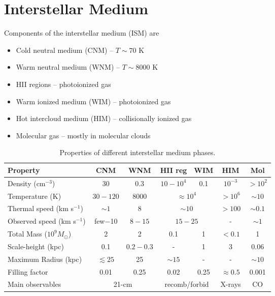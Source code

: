  \label{ch:Introduction}
\section*{Interstellar Medium}
Components of the interstellar medium (ISM) are 
\begin{itemize}
  \item \textsf{Cold neutral medium (CNM)} -- $T \sim 70$ K
  \item \textsf{Warm neutral medium (WNM)} -- $T \sim 8000$ K
  \item \textsf{HII regions} -- photoionized gas
  \item \textsf{Warm ionized medium (WIM)} -- photoionized gas
  \item \textsf{Hot intercloud medium (HIM)} -- collisionally ionized gas
  \item \textsf{Molecular gas} -- mostly in molecular clouds
\end{itemize} 

\begin{table}[h]
    \centering
    \begin{tabular}{lcccccc}
        \toprule
        Property & CNM & WNM & HII reg & WIM & HIM & Mol \\
        \midrule
        Density (cm$^{-3}$) & 30 & 0.3 & $10 - 10^4$ & 0.1 & $10^{-3}$ & $> 10^2$ \\
        Temperature (K) & $30 - 120$ & 8000 & \multicolumn{2}{c}{$\approx 10^4$} & $> 10^6$ & $\sim 10$ \\
          Thermal speed (km s$^{-1}$) & $\sim 1$ & 8 & \multicolumn{2}{c}{$\sim 10$} & $> 100$ & $\sim 0.1$ \\
          Observed speed (km s$^{-1}$) & few$-$10 & $8 - 15$ & \multicolumn{2}{c}{$15 - 25$} & - & $\sim 1$ \\
        Total Mass ($10^9 M_\odot$) & 2 & 2 & 0.1 & 1 & $< 0.1$ & 1 \\
        Scale-height (kpc) & 0.1 & $0.2 - 0.3$ & - & 1 & 3 & 0.06 \\
        Maximum Radius (kpc) & $\lesssim 25$ & 25 & $\sim 15$ & - & - & $\sim 10$ \\
        Filling factor & 0.01 & 0.25 & 0.02 & 0.25 & $\approx 0.5$ & 0.001 \\
        Main observables & \multicolumn{2}{c}{21-cm} & \multicolumn{2}{c}{recomb/forbid} & X-rays & CO \\
        \bottomrule
    \end{tabular}
    \caption{Properties of different interstellar medium phases.}
    \label{tab:ism_properties}
\end{table}

